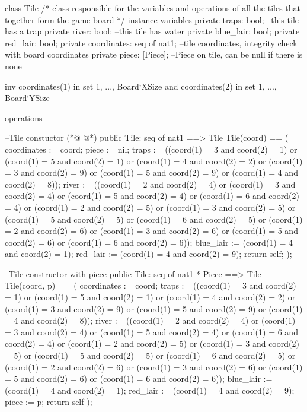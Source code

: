 \begin{vdmpp}[breaklines=true]
class Tile
/*
class responsible for the variables and operations of all the tiles that together form the game board
*/
instance variables
  private traps: bool; --this tile has a trap
  private river: bool; --this tile has water
  private blue_lair: bool;
  private red_lair: bool;
  private coordinates: seq of nat1; --tile coordinates, integrity check with board coordinates
  private piece: [Piece]; --Piece on tile, can be null if there is none
  
  inv coordinates(1) in set {1, ..., Board`XSize} and
    coordinates(2) in set {1, ..., Board`YSize}
  
operations

  --Tile constuctor
(*@
\label{Tile:19}
@*)
  public Tile: seq of nat1 ==> Tile
  Tile(coord) == (
    coordinates := coord;
    piece := nil;
    traps := ((coord(1) = 3 and coord(2) = 1) or (coord(1) = 5 and coord(2) = 1) or (coord(1) = 4 and coord(2) = 2)
          or (coord(1) = 3 and coord(2) = 9) or (coord(1) = 5 and coord(2) = 9) or (coord(1) = 4 and coord(2) = 8));
    river := ((coord(1) = 2 and coord(2) = 4) or (coord(1) = 3 and coord(2) = 4) or (coord(1) = 5 and coord(2) = 4) or (coord(1) = 6 and coord(2) = 4)
        or (coord(1) = 2 and coord(2) = 5) or (coord(1) = 3 and coord(2) = 5) or (coord(1) = 5 and coord(2) = 5) or (coord(1) = 6 and coord(2) = 5)
        or (coord(1) = 2 and coord(2) = 6) or (coord(1) = 3 and coord(2) = 6) or (coord(1) = 5 and coord(2) = 6) or (coord(1) = 6 and coord(2) = 6)); 
    blue_lair := (coord(1) = 4 and coord(2) = 1);
    red_lair := (coord(1) = 4 and coord(2) = 9);
    return self;
  );
  
  --Tile constructor with piece
  public Tile: seq of nat1 * Piece ==> Tile
    Tile(coord, p) == (
    coordinates := coord;
    traps := ((coord(1) = 3 and coord(2) = 1) or (coord(1) = 5 and coord(2) = 1) or (coord(1) = 4 and coord(2) = 2)
          or (coord(1) = 3 and coord(2) = 9) or (coord(1) = 5 and coord(2) = 9) or (coord(1) = 4 and coord(2) = 8));
    river := ((coord(1) = 2 and coord(2) = 4) or (coord(1) = 3 and coord(2) = 4) or (coord(1) = 5 and coord(2) = 4) or (coord(1) = 6 and coord(2) = 4)
        or (coord(1) = 2 and coord(2) = 5) or (coord(1) = 3 and coord(2) = 5) or (coord(1) = 5 and coord(2) = 5) or (coord(1) = 6 and coord(2) = 5)
        or (coord(1) = 2 and coord(2) = 6) or (coord(1) = 3 and coord(2) = 6) or (coord(1) = 5 and coord(2) = 6) or (coord(1) = 6 and coord(2) = 6));
    blue_lair := (coord(1) = 4 and coord(2) = 1);
    red_lair := (coord(1) = 4 and coord(2) = 9); 
    piece := p;
    return self
  );
  

\end{vdmpp}
